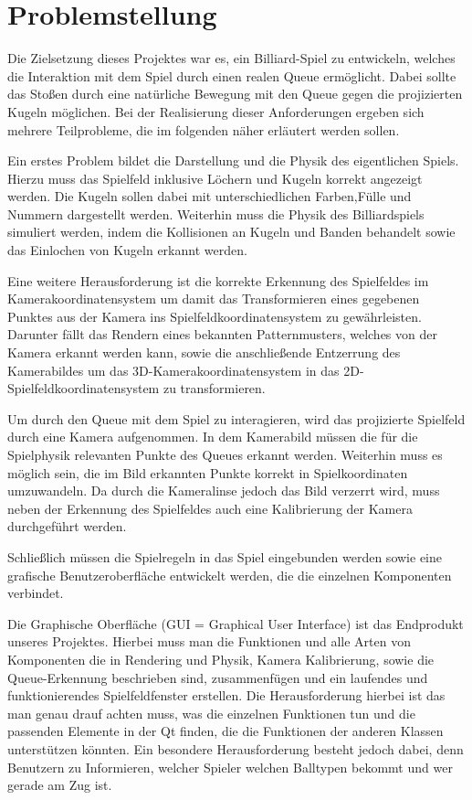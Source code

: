 
\chapter{Problemstellung}
Die Zielsetzung dieses Projektes war es, ein Billiard-Spiel zu entwickeln, welches die Interaktion mit dem Spiel durch einen realen Queue ermöglicht.
Dabei sollte das Stoßen durch eine natürliche Bewegung mit den Queue gegen die projizierten Kugeln möglichen.
Bei der Realisierung dieser Anforderungen ergeben sich mehrere Teilprobleme, die im folgenden näher erläutert werden sollen.

Ein erstes Problem bildet die Darstellung und die Physik des eigentlichen Spiels. Hierzu muss das Spielfeld inklusive Löchern und Kugeln korrekt angezeigt werden. 
Die Kugeln sollen dabei mit unterschiedlichen Farben,Fülle und Nummern dargestellt werden.
Weiterhin muss die Physik des Billiardspiels simuliert werden, indem die Kollisionen an Kugeln und Banden behandelt sowie das Einlochen von Kugeln erkannt werden.

Eine weitere Herausforderung ist die korrekte Erkennung des Spielfeldes im Kamerakoordinatensystem um damit das Transformieren eines gegebenen Punktes aus der Kamera ins Spielfeldkoordinatensystem zu gewährleisten. Darunter fällt das Rendern eines bekannten Patternmusters, welches von der Kamera erkannt werden kann, sowie die anschließende Entzerrung des Kamerabildes um das 3D-Kamerakoordinatensystem in das 2D-Spielfeldkoordinatensystem zu transformieren.

Um durch den Queue mit dem Spiel zu interagieren, wird das projizierte Spielfeld durch eine Kamera aufgenommen. 
In dem Kamerabild müssen die für die Spielphysik relevanten Punkte des Queues erkannt werden.
Weiterhin muss es möglich sein, die im Bild erkannten Punkte korrekt in Spielkoordinaten umzuwandeln.
Da durch die Kameralinse jedoch das Bild verzerrt wird, muss neben der Erkennung des Spielfeldes auch eine Kalibrierung der Kamera durchgeführt werden.

Schließlich müssen die Spielregeln in das Spiel eingebunden werden sowie eine grafische Benutzeroberfläche entwickelt werden, die die einzelnen Komponenten verbindet.

Die Graphische Oberfläche (GUI = Graphical User Interface) ist das Endprodukt unseres Projektes. Hierbei muss man die Funktionen und alle Arten von Komponenten die in Rendering und Physik, Kamera Kalibrierung, sowie die Queue-Erkennung beschrieben sind, zusammenfügen und ein laufendes und funktionierendes Spielfeldfenster erstellen. Die Herausforderung hierbei ist das man genau drauf achten muss, was die einzelnen Funktionen tun und die passenden Elemente in der Qt finden, die die Funktionen der anderen Klassen unterstützen könnten.
Ein besondere Herausforderung besteht jedoch dabei, denn Benutzern zu Informieren, welcher Spieler welchen Balltypen bekommt und wer gerade am Zug ist.

